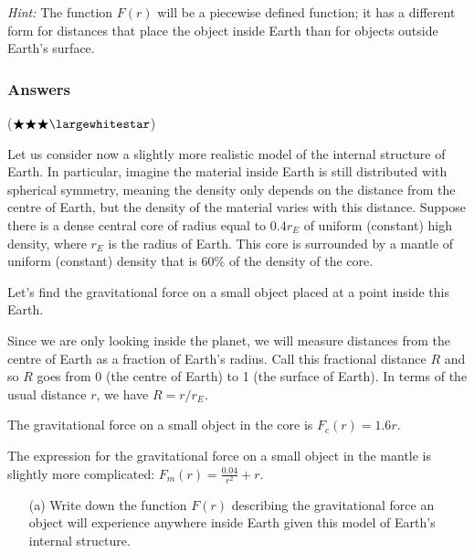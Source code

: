 \documentclass{exam}
\begin{document}
\begin{questions}
\begin{enumerate}
\end{enumerate}

\textit{Hint:}  The function  $F(r)$ will be a piecewise defined function; it has a different form for distances that place the object inside Earth than for objects outside Earth's surface. 

\color{blue}
\subsubsection*{Answers}
\color{black}


\question\label{p} ($\bigstar \bigstar \bigstar \largewhitestar$)

Let us consider now a slightly more realistic model of the internal structure of Earth. In particular, imagine the material inside Earth is still distributed with spherical symmetry, meaning the density only depends on the distance from the centre of Earth, but the density of the material varies with this distance. Suppose there is a dense central core of radius equal to $0.4r_E$ of uniform (constant) high density, where $r_E$ is the radius of Earth. This core is surrounded by a mantle of uniform (constant) density that is 60\% of the density of the core.

Let's find the gravitational force on a small object placed at a point inside this Earth. 

Since we are only looking inside the planet, we will measure distances from the centre of Earth as a fraction of Earth's radius. Call this fractional distance $R$ and so $R$ goes from 0 (the centre of Earth) to 1 (the surface of Earth). In terms of the usual distance $r$, we have $R=r/r_E$.

The gravitational force on a small object in the core is $F_c(r)= 1.6r$. 

The expression for the gravitational force on a small object in the mantle is slightly more complicated: $F_m(r)= \frac{0.04}{r^2}+r$.
\begin{enumerate}
\item[(a)] Write down the function $F(r)$ describing the gravitational force an object will experience anywhere inside Earth given this model of Earth's internal structure.


\end{enumerate}
\end{questions}
\end{document}
